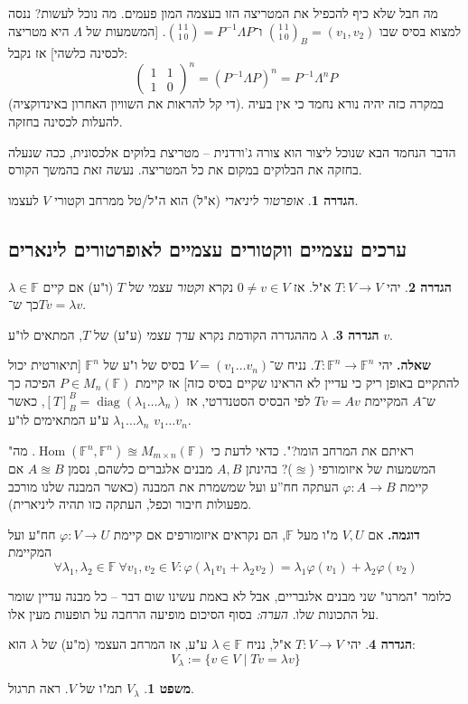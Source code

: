 \documentclass[a4paper]{article}
\DeclareMathOperator{\diag}    {diag}
\DeclareMathOperator{\Hom}     {Hom}
\newcommand\F         {\mathbb{F}}
\newcommand\co        {\colon}
\newcommand\pms[1]    {\begin{pmatrix}
		#1
\end{pmatrix}}
\renewcommand\lg      {\lambda}
\newcommand\op    {^{-1}}
\newcommand\cl [1]    {\left ( #1 \right )}
\renewcommand\phi     {\varphi}
\theoremstyle{definition}
\newtheorem{Theorem}{משפט}
\newtheorem{definition}{הגדרה}
\newcommand\theo  [1] {\begin{Theorem}#1\end{Theorem}}
\newcommand\defi  [1] {\begin{definition}#1\end{definition}}
\begin{document}
	מה חבל שלא כיף להכפיל את המטריצה הזו בעצמה המון פעמים. מה נוכל לעשות? ננסה למצוא בסיס שבו $\binom{1 \, 1}{1\, 0}_B = (v_1, v_2)$ ו־$\binom{1 \, 1}{1 \, 0} = P\op \Lambda P$. [המשמעות של $\Lambda$ היא מטריצה לכסינה כלשהי] אז נקבל: 
	\[ \pms{1 & 1 \\ 1 & 0}^{n} = \cl{P\op \Lambda P}^{n} = P\op\Lambda^nP \]
	(די קל להראות את השוויון האחרון באינדוקציה). במקרה כזה יהיה נורא נחמד כי אין בעיה להעלות לכסינה בחזקה. 
	
	הדבר הנחמד הבא שנוכל ליצור הוא צורה ג'ורדנית – מטריצת בלוקים אלכסונית, ככה שנעלה בחזקה את הבלוקים במקום את כל המטריצה. נעשה זאת בהמשך הקורס. 
	
	\defi{\textit{אופרטור ליניארי} (א"ל) הוא ה"ל/טל ממרחב וקטורי $V$ לעצמו. }
	
	
	\subsection{ערכים עצמיים ווקטורים עצמיים לאופרטורים לינארים}
	\defi{יהי $T \co V \to V$ א"ל. אז $0 \neq v \in V$ נקרא \textit{וקטור עצמי} של $T$ (ו"ע) אם קיים $\lg \in \F$ כך ש־$T v =\lg v$. }
	
	\defi{$\lg$ מההגדרה הקודמת נקרא \textit{ערך עצמי} (ע"ע) של $T$, המתאים לו"ע $v$. }
	
	\textbf{שאלה. }יהי $T \co \F^n \to \F^n$. נניח ש־$V = (v_1 \dots v_n)$ בסיס של ו"ע של $\F^n$ [תיאורטית יכול להתקיים באופן ריק כי עדיין לא הראינו שקיים בסיס כזה] אז קיימת $P \in M_n(\F)$ הפיכה כך ש־$A$ המקיימת $Tv = Av$ לפי הבסיס הסטנדרטי, אז $[T]^B_B = \diag(\lg_1 \dots \lg_n)$, כאשר $\lg_1 \dots \lg_n$ ע"ע המתאימים לו"ע $v_1 \dots v_n$. 
	
	"ראיתם את המרחב הומו?".
	כדאי לדעת כי $\Hom(\F^n, \F^n) \approxeq M_{m \times n}(\F)$. מה המשמעות של איזומורפי ($\approxeq$)? בהינתן $A, B$ מבנים אלגברים כלשהם, נסמן $A \approxeq B$ אם קיימת $\phi \co A \to B$ העתקה חח''ע ועל שמשמרת את המבנה (כאשר המבנה שלנו מורכב מפעולות חיבור וכפל, העתקה כזו תהיה ליניארית). 
	
	\textbf{דוגמה. }אם $V, U$ מ"ו מעל $\F$, הם נקראים איזומורפים אם קיימת $\phi \co V \to U$ חח"ע ועל המקיימת
	\[ \forall \lg_1, \lg_2 \in \F\: \forall v_1, v_2 \in V \co \phi(\lg_1v_1 + \lg_2v_2) = \lg_1\phi(v_1) + \lg_2\phi(v_2) \]
	
	כלומר "המרנו" שני מבנים אלגבריים, אבל לא באמת עשינו שום דבר – כל מבנה עדיין שומר על התכונות שלו. \textit{הערה: }בסוף הסיכום מופיעה הרחבה על תופעות מעין אלו. 
	
	\defi{יהי $T \co V \to V$ א"ל, נניח $\lg \in \F$ ע"ע, אז המרחב העצמי (מ"ע) של $\lg$ הוא: 
		\[ V_\lg := \{v \in V \mid Tv = \lg v\} \]}
	\theo{$V_\lg$ תמ"ו של $V$. ראה תרגול. }
	
\end{document}
